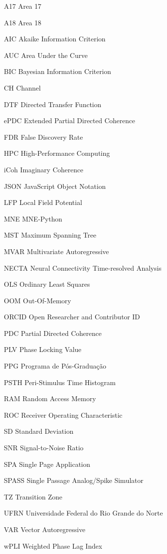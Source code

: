 \documentclass[
	12pt,				%
	oneside,
	a4paper,			%
	chapter=TITLE,
	brazil,				%
	english,			%
	]{abntex2}
\begin{document}
\begin{siglas}
\item[A17] Area 17
\item[A18] Area 18
\item[AIC] Akaike Information Criterion
\item[AUC] Area Under the Curve
\item[BIC] Bayesian Information Criterion
\item[CH] Channel
\item[DTF] Directed Transfer Function
\item[ePDC] Extended Partial Directed Coherence
\item[FDR] False Discovery Rate
\item[HPC] High-Performance Computing
\item[iCoh] Imaginary Coherence
\item[JSON] JavaScript Object Notation
\item[LFP] Local Field Potential
\item[MNE] MNE-Python
\item[MST] Maximum Spanning Tree
\item[MVAR] Multivariate Autoregressive
\item[NECTA] Neural Connectivity Time-resolved Analysis
\item[OLS] Ordinary Least Squares
\item[OOM] Out-Of-Memory
\item[ORCID] Open Researcher and Contributor ID
\item[PDC] Partial Directed Coherence
\item[PLV] Phase Locking Value
\item[PPG] Programa de Pós-Graduação
\item[PSTH] Peri-Stimulus Time Histogram
\item[RAM] Random Access Memory
\item[ROC] Receiver Operating Characteristic
\item[SD] Standard Deviation
\item[SNR] Signal-to-Noise Ratio
\item[SPA] Single Page Application
\item[SPASS] Single Passage Analog/Spike Simulator
\item[TZ] Transition Zone
\item[UFRN] Universidade Federal do Rio Grande do Norte
\item[VAR] Vector Autoregressive
\item[wPLI] Weighted Phase Lag Index
\end{siglas}
\end{document}
